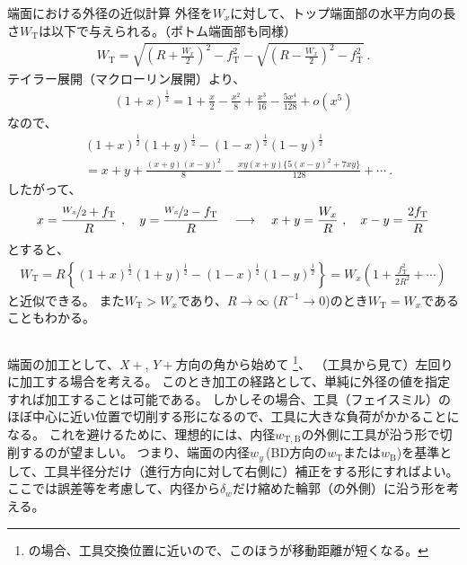 \begin{Column}{端面における外径の近似計算}
外径を$W_x$に対して、トップ端面部の水平方向の長さ$W_\mathrm T$は以下で与えられる。（ボトム端面部も同様）
\begin{align*}
  W_\mathrm T
  = \sqrt{\left(R+\frac{W_x}2\right)^2-f_\mathrm T^2}
    -\sqrt{\left(R-\frac{W_x}2\right)^2-f_\mathrm T^2}\ .
\end{align*}
テイラー展開（マクローリン展開）より、
\begin{align*}
  (1+x)^\frac12 = 1+\frac x2-\frac{x^2}8+\frac{x^3}{16}-\frac{5x^4}{128}+o\left(x^5\right)
\end{align*}
なので、
\begin{align*}
  & (1+x)^\frac12(1+y)^\frac12-(1-x)^\frac12(1-y)^\frac12\\
  &= x+y+\frac{(x+y)(x-y)^2}8-\frac{xy(x+y)\big\{5(x-y)^2+7xy\big\}}{128}+\cdots\ .
\end{align*}
したがって、
\begin{align*}
  x = \frac{\nicefrac{W_x}2+f_\mathrm T}R\ ,\quad y = \frac{\nicefrac{W_x}2-f_\mathrm T}R\quad
  \longrightarrow \quad
  x+y = \frac{W_x}R\ , \quad x-y = \frac{2f_\mathrm T}R
\end{align*}
とすると、
\begin{align*}
  W_\mathrm T
  = R\left\{(1+x)^\frac12(1+y)^\frac12-(1-x)^\frac12(1-y)^\frac12\right\}
  = W_x\left(1+\frac{f_\mathrm T^2}{2R^2}+\cdots\right)
\end{align*}
と近似できる。
また$W_\mathrm T > W_x$であり、$R\to\infty$ ($R^{-1}\to0$)のとき$W_\mathrm T = W_x$であることもわかる。
\end{Column}



\clearpage
端面の加工として、$X+$, $Y+$方向の角から始めて
\footnote{\DMname の場合、工具交換位置に近いので、このほうが移動距離が短くなる。}、
（工具から見て）左回りに加工する場合を考える。
このとき加工の経路として、単純に外径の値を指定すれば加工することは可能である。
しかしその場合、工具（フェイスミル）のほぼ中心に近い位置で切削する形になるので、工具に大きな負荷がかかることになる。
これを避けるために、理想的には、内径$w_{\mathrm T, \mathrm B}$の外側に工具が沿う形で切削するのが望ましい。
つまり、端面の内径$w_y$\,(BD方向の$w_{\mathrm T}$または$w_{\mathrm B}$)を基準として、工具半径分だけ（進行方向に対して右側に）補正をする形にすればよい。
ここでは誤差等を考慮して、内径から$\delta_w$だけ縮めた輪郭（の外側）に沿う形を考える。


